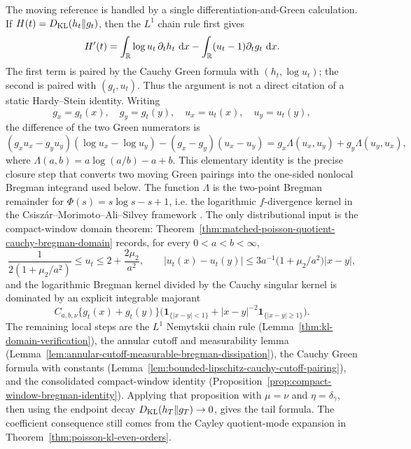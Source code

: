 The moving reference is handled by a single differentiation-and-Green
calculation.  If
\(H(t)=D_{\rm KL}(h_t\|g_t)\), then the \(L^1\) chain rule first gives
\begin{equation}\label{eq:section4-two-pair-chain-rule}
H'(t)=\int_{\mathbb{R}}\log u_t\,\partial_t h_t\,\,\mathrm{d} x
-\int_{\mathbb{R}}(u_t-1)\partial_tg_t\,\,\mathrm{d} x .
\end{equation}
The first term is paired by the Cauchy Green formula with
\((h_t,\log u_t)\); the second is paired with \((g_t,u_t)\).  Thus the
argument is not a direct citation of a static Hardy--Stein identity.  Writing
\[
g_x=g_t(x),\quad g_y=g_t(y),\quad
u_x=u_t(x),\quad u_y=u_t(y),
\]
the difference of the two Green numerators is
\begin{equation}\label{eq:section4-two-green-numerator-difference}
(g_xu_x-g_yu_y)(\log u_x-\log u_y)
-(g_x-g_y)(u_x-u_y)
=g_x\Lambda(u_x,u_y)+g_y\Lambda(u_y,u_x),
\end{equation}
where \(\Lambda(a,b)=a\log(a/b)-a+b\).  This elementary identity is the
precise closure step that converts two moving Green pairings into the
one-sided nonlocal Bregman integrand used below.  The function
\(\Lambda\) is the two-point Bregman remainder for
\(\Phi(s)=s\log s-s+1\), i.e. the logarithmic
\(f\)-divergence kernel in the Csisz{\'a}r--Morimoto--Ali--Silvey framework
\cite{AliSilvey1966Divergence,Csiszar1967,Morimoto1963Markov,
Vajda1989TheoryDivergence,Bregman1967}.  The only distributional input is the
compact-window domain theorem:
Theorem~\ref{thm:matched-poisson-quotient-cauchy-bregman-domain} records, for
every \(0<a<b<\infty\),
\[
\frac{1}{2(1+\mu_2/a^2)}\le u_t\le
2+\frac{2\mu_2}{a^2},\qquad
|u_t(x)-u_t(y)|\le
3a^{-1}\bigl(1+\mu_2/a^2\bigr)|x-y|,
\]
and the logarithmic Bregman kernel divided by the Cauchy singular kernel is
dominated by an explicit integrable majorant
\[
C_{a,b,\nu}\{g_t(x)+g_t(y)\}
\bigl(\mathbf1_{\{|x-y|<1\}}+|x-y|^{-2}\mathbf1_{\{|x-y|\ge1\}}\bigr).
\]
The remaining local steps are the \(L^1\) Nemytskii chain rule
(Lemma~\ref{thm:kl-domain-verification}), the annular cutoff and
measurability lemma
(Lemma~\ref{lem:annular-cutoff-measurable-bregman-dissipation}), the Cauchy
Green formula with constants
(Lemma~\ref{lem:bounded-lipschitz-cauchy-cutoff-pairing}), and the
consolidated compact-window identity
(Proposition~\ref{prop:compact-window-bregman-identity}).  Applying that
proposition with \(\mu=\nu\) and \(\eta=\delta_{\bar\gamma}\), then using
the endpoint decay \(D_{\rm KL}(h_T\|g_T)\to0\), gives the tail formula.
The coefficient consequence still comes from the Cayley quotient-mode
expansion in Theorem~\ref{thm:poisson-kl-even-orders}.

